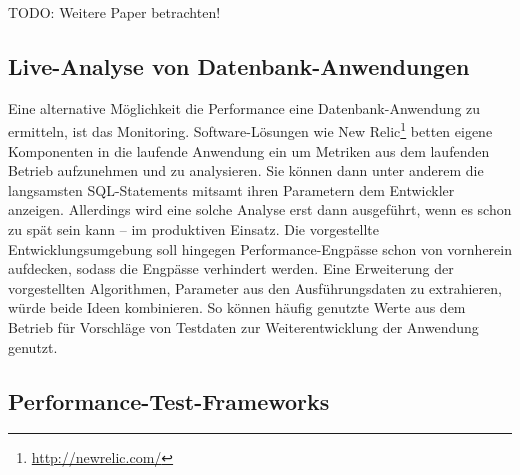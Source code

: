 TODO: Weitere Paper betrachten!

\subsection{Live-Analyse von Datenbank-Anwendungen}
Eine alternative Möglichkeit die Performance eine Datenbank-Anwendung zu ermitteln, ist das Monitoring.
Software-Lösungen wie New Relic\footnote{\url{http://newrelic.com/}} betten eigene Komponenten in die laufende Anwendung ein um Metriken aus dem laufenden Betrieb aufzunehmen und zu analysieren.
Sie können dann unter anderem die langsamsten SQL-Statements mitsamt ihren Parametern dem Entwickler anzeigen.
Allerdings wird eine solche Analyse erst dann ausgeführt, wenn es schon zu spät sein kann – im produktiven Einsatz.
Die vorgestellte Entwicklungsumgebung soll hingegen Performance-Engpässe schon von vornherein aufdecken, sodass die Engpässe verhindert werden.
Eine Erweiterung der vorgestellten Algorithmen, Parameter aus den Ausführungsdaten zu extrahieren, würde beide Ideen kombinieren.
So können häufig genutzte Werte aus dem Betrieb für Vorschläge von Testdaten zur Weiterentwicklung der Anwendung genutzt.

\subsection{Performance-Test-Frameworks}
